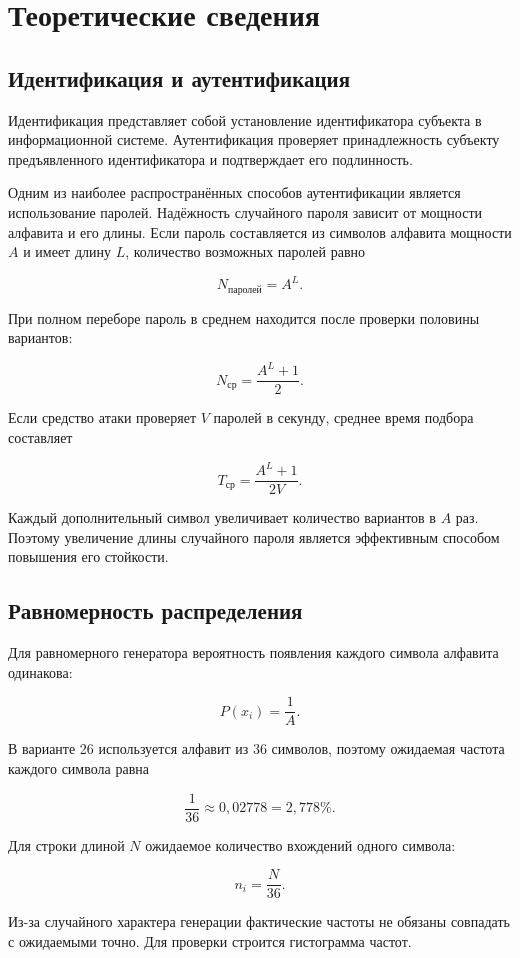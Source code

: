 \documentclass[a4paper,14pt,oneside]{extarticle}
\begin{document}
\section{Теоретические сведения}

\subsection{Идентификация и аутентификация}

Идентификация представляет собой установление идентификатора субъекта в
информационной системе. Аутентификация проверяет принадлежность субъекту
предъявленного идентификатора и подтверждает его подлинность.

Одним из наиболее распространённых способов аутентификации является
использование паролей. Надёжность случайного пароля зависит от мощности
алфавита и его длины. Если пароль составляется из символов алфавита мощности
$A$ и имеет длину $L$, количество возможных паролей равно

\[
N_{\text{паролей}} = A^L.
\]

При полном переборе пароль в среднем находится после проверки половины
вариантов:

\[
N_{\text{ср}} = \frac{A^L+1}{2}.
\]

Если средство атаки проверяет $V$ паролей в секунду, среднее время подбора
составляет

\[
T_{\text{ср}} = \frac{A^L+1}{2V}.
\]

Каждый дополнительный символ увеличивает количество вариантов в $A$ раз.
Поэтому увеличение длины случайного пароля является эффективным способом
повышения его стойкости.

\subsection{Равномерность распределения}

Для равномерного генератора вероятность появления каждого символа алфавита
одинакова:

\[
P(x_i)=\frac{1}{A}.
\]

В варианте 26 используется алфавит из 36 символов, поэтому ожидаемая частота
каждого символа равна

\[
\frac{1}{36}\approx 0{,}02778=2{,}778\%.
\]

Для строки длиной $N$ ожидаемое количество вхождений одного символа:

\[
n_i=\frac{N}{36}.
\]

Из-за случайного характера генерации фактические частоты не обязаны совпадать
с ожидаемыми точно. Для проверки строится гистограмма частот.
\end{document}
